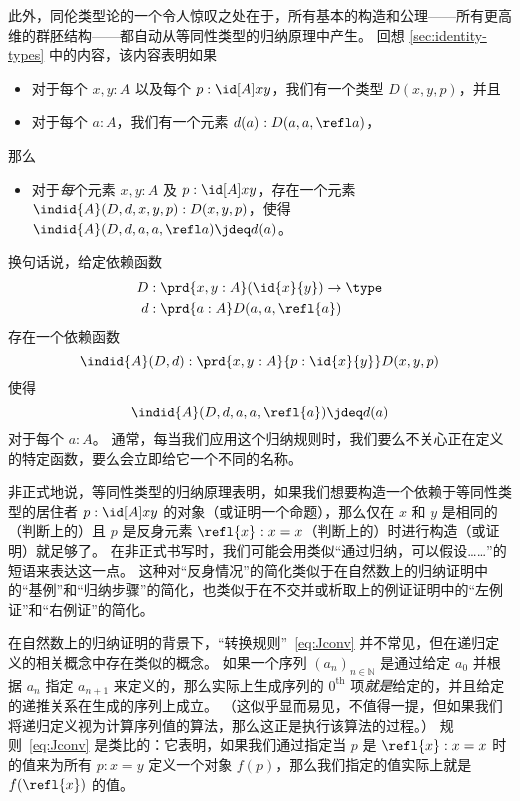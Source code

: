 此外，同伦类型论的一个令人惊叹之处在于，所有基本的构造和公理——所有更高维的群胚结构——都自动从等同性类型的归纳原理中产生。
回想 \cref{sec:identity-types} 中的内容，该内容表明如果
\begin{itemize}
  \item 对于每个 $x,y:A$ 以及每个 $p:\id[A]xy$，我们有一个类型 $D(x,y,p)$，并且
  \item 对于每个 $a:A$，我们有一个元素 $d(a):D(a,a,\refl a)$，
\end{itemize}
那么
\begin{itemize}
  \item 对于\emph{每}个元素 $x,y:A$ 及 $p:\id[A]xy$，存在一个元素 $\indid{A}(D,d,x,y,p):D(x,y,p)$，使得 $\indid{A}(D,d,a,a,\refl a) \jdeq d(a)$。
\end{itemize}
换句话说，给定依赖函数
\begin{align*}
  D & :\prd{x,y:A} (\id{x}{y}) \to \type\\
  d & :\prd{a:A} D(a,a,\refl{a})
\end{align*}
存在一个依赖函数
\[\indid{A}(D,d):\prd{x,y:A}{p:\id{x}{y}} D(x,y,p)\]
使得
\begin{equation}\label{eq:Jconv}
\indid{A}(D,d,a,a,\refl{a})\jdeq d(a)
\end{equation}
对于每个 $a:A$。
通常，每当我们应用这个归纳规则时，我们要么不关心正在定义的特定函数，要么会立即给它一个不同的名称。

非正式地说，等同性类型的归纳原理表明，如果我们想要构造一个依赖于等同性类型的居住者 $p:\id[A]xy$ 的对象（或证明一个命题），那么仅在 $x$ 和 $y$ 是相同的（判断上的）且 $p$ 是反身元素 $\refl{x}:x=x$（判断上的）时进行构造（或证明）就足够了。
在非正式书写时，我们可能会用类似“通过归纳，可以假设……”的短语来表达这一点。
这种对“反身情况”的简化类似于在自然数上的归纳证明中的“基例”和“归纳步骤”的简化，也类似于在不交并或析取上的例证证明中的“左例证”和“右例证”的简化。%

在自然数上的归纳证明的背景下，“转换规则”~\eqref{eq:Jconv} 并不常见，但在递归定义的相关概念中存在类似的概念。
如果一个序列 $(a_n)_{n\in \mathbb{N}}$ 是通过给定 $a_0$ 并根据 $a_n$ 指定 $a_{n+1}$ 来定义的，那么实际上生成序列的 $0^{\mathrm{th}}$ 项\emph{就是}给定的，并且给定的递推关系在生成的序列上成立。
（这似乎显而易见，不值得一提，但如果我们将递归定义视为计算序列值的算法，那么这正是执行该算法的过程。）
规则~\eqref{eq:Jconv} 是类比的：它表明，如果我们通过指定当 $p$ 是 $\refl{x}:x=x$ 时的值来为所有 $p:x=y$ 定义一个对象 $f(p)$，那么我们指定的值实际上就是 $f(\refl{x})$ 的值。

